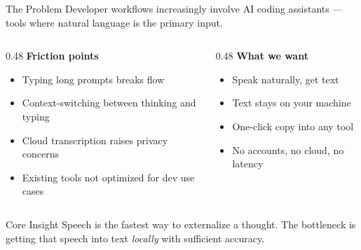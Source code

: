 \documentclass{beamer}
\begin{document}
\begin{frame}{The Problem}
    \small
    Developer workflows increasingly involve AI coding assistants ---
    tools where natural language is the primary input.

    \vspace{0.2em}
    \begin{columns}[T]
        \begin{column}{0.48\textwidth}
            \textbf{Friction points}
            \begin{itemize}\setlength{\itemsep}{0pt}\setlength{\parskip}{0pt}
                \item Typing long prompts breaks flow
                \item Context-switching between thinking and typing
                \item Cloud transcription raises privacy concerns
                \item Existing tools not optimized for dev use cases
            \end{itemize}
        \end{column}
        \begin{column}{0.48\textwidth}
            \textbf{What we want}
            \begin{itemize}\setlength{\itemsep}{0pt}\setlength{\parskip}{0pt}
                \item Speak naturally, get text
                \item Text stays on your machine
                \item One-click copy into any tool
                \item No accounts, no cloud, no latency
            \end{itemize}
        \end{column}
    \end{columns}

    \vspace{0.2em}
    \begin{block}{Core Insight}
        Speech is the fastest way to externalize a thought.
        The bottleneck is getting that speech into text \textit{locally}
        with sufficient accuracy.
    \end{block}
\end{frame}
\end{document}
